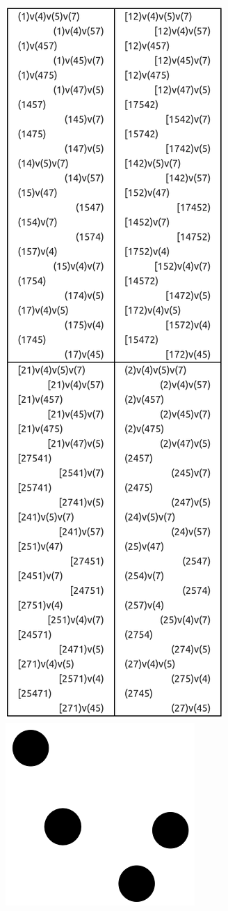 \begin{appendices}
\begin{figure}[H]
\includegraphics[scale=0.15]{images/x9/x9_4v_0e.png}
\includegraphics[scale=0.1]{images/x9/x9_4v_0e_vis.png}

\end{figure}
\end{appendices}

